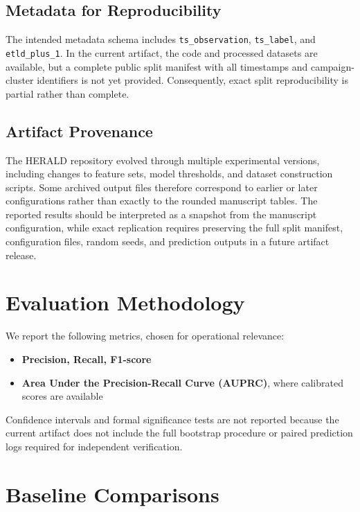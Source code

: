 \documentclass[conference]{IEEEtran}
\begin{document}
\subsection{Metadata for Reproducibility}

The intended metadata schema includes \texttt{ts\_observation}, \texttt{ts\_label}, and \texttt{etld\_plus\_1}. In the current artifact, the code and processed datasets are available, but a complete public split manifest with all timestamps and campaign-cluster identifiers is not yet provided. Consequently, exact split reproducibility is partial rather than complete.

\subsection{Artifact Provenance}

The HERALD repository evolved through multiple experimental versions, including changes to feature sets, model thresholds, and dataset construction scripts. Some archived output files therefore correspond to earlier or later configurations rather than exactly to the rounded manuscript tables. The reported results should be interpreted as a snapshot from the manuscript configuration, while exact replication requires preserving the full split manifest, configuration files, random seeds, and prediction outputs in a future artifact release.

\section{Evaluation Methodology}
\label{sec:evaluation}

We report the following metrics, chosen for operational relevance:

\begin{itemize}
    \item \textbf{Precision, Recall, F1-score}
    \item \textbf{Area Under the Precision-Recall Curve (AUPRC)}, where calibrated scores are available
\end{itemize}

Confidence intervals and formal significance tests are not reported because the current artifact does not include the full bootstrap procedure or paired prediction logs required for independent verification.

\section{Baseline Comparisons}
\label{sec:baselines}
\end{document}
